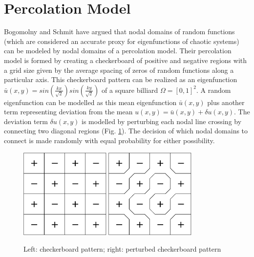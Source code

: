 \documentclass{report}
\begin{document}
\section{Percolation Model}
\label{sec:percolation}
Bogomolny and Schmit \cite{bogomolny} have argued that nodal domains of random functions (which are considered an accurate proxy for eigenfunctions of chaotic systems) can be modeled by nodal domains of a percolation model. Their percolation model is formed by creating a checkerboard of positive and negative regions with a grid size given by the average spacing of zeros of random functions along a particular axis. This checkerboard pattern can be realized as an eigenfunction $\bar{u}(x,y) = sin(\frac{kx}{\sqrt{2}})sin(\frac{ky}{\sqrt{2}})$ of a square billiard $\Omega = [0,1]^{2}$. A random eigenfunction can be modelled as this mean eigenfunction $\bar{u}(x,y)$ plus another term representing deviation from the mean $u(x,y) = \bar u(x,y) + \delta u(x,y)$. The deviation term $\delta u(x,y)$ is modelled by perturbing each nodal line crossing by connecting two diagonal regions (Fig. \ref{fig:percolation}). The decision of which nodal domains to connect is made randomly with equal probability for either possibility.

\begin{figure}
  \begin{center}
    \includegraphics[width=0.4\textwidth]{figs/percolation/checkerboard.eps}
    \hspace{1 cm}
    \includegraphics[width=0.4\textwidth]{figs/percolation/perturbed.eps}
    \caption{Left: checkerboard pattern; right: perturbed checkerboard pattern}
    \label{fig:percolation}
  \end{center}
\end{figure}
\end{document}
